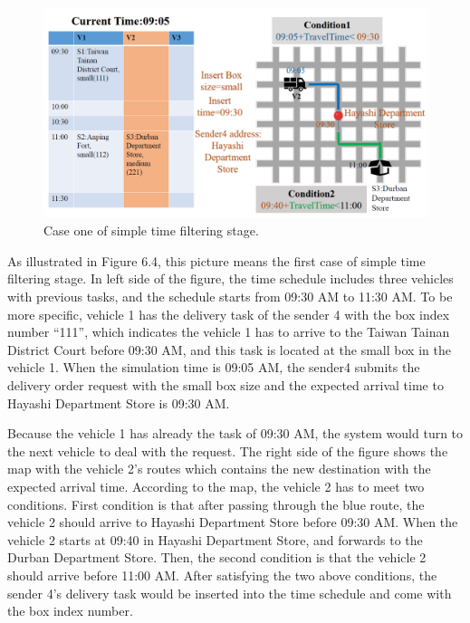 \documentclass[12pt]{ksthesis}
\begin{document}
\begin{thesis}
{\begin{figure}[H]
\centering
\includegraphics[width=1.14\textwidth]{./Thesis_figures/F6-4_caseOne_SchedulingStage.PNG}
\caption{\large Case one of simple time filtering stage.}
\vspace{0.5cm}
\label{Fig:CaseOne_TimeFiltering}
\end{figure}

As illustrated in Figure 6.4, this picture means the first case of simple time filtering stage.
In left side of the figure, the time schedule includes three vehicles with previous tasks, and the schedule starts from 09:30 AM to 11:30 AM. To be more specific, vehicle 1 has the delivery task of the sender 4 with the box index number “111”, which indicates the vehicle 1 has to arrive to the Taiwan Tainan District Court before 09:30 AM, and this task is located at the small box in the vehicle 1.
When the simulation time is 09:05 AM, the sender4 submits the delivery order request with the small box size and the expected arrival time to Hayashi Department Store is 09:30 AM.

Because the vehicle 1 has already the task of 09:30 AM, the system would turn to the next vehicle to deal with the request.
The right side of the figure shows the map with the vehicle 2’s routes which contains the new destination with the expected arrival time.
According to the map, the vehicle 2 has to meet two conditions. First condition is that after passing through the blue route, the vehicle 2 should arrive to Hayashi Department Store before 09:30 AM. 
When the vehicle 2 starts at 09:40 in Hayashi Department Store, and forwards to the Durban Department Store. Then, the second condition is that the vehicle 2 should arrive before 11:00 AM.
After satisfying the two above conditions, the sender 4’s delivery task would be inserted into the time schedule and come with the box index number. 

}
\end{thesis}
\end{document}
